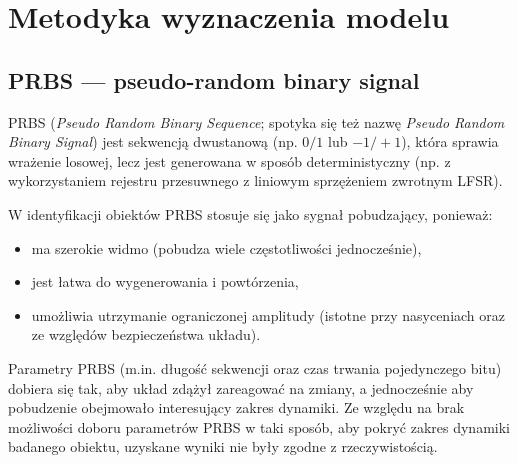 \section{Metodyka wyznaczenia modelu}

\subsection{PRBS --- pseudo-random binary signal}

PRBS (\emph{Pseudo Random Binary Sequence}; spotyka się też nazwę \emph{Pseudo Random Binary Signal}) jest sekwencją dwustanową (np. $0/1$ lub $-1/+1$), która sprawia wrażenie losowej, lecz jest generowana w sposób deterministyczny (np. z wykorzystaniem rejestru przesuwnego z liniowym sprzężeniem zwrotnym LFSR).

W identyfikacji obiektów PRBS stosuje się jako sygnał pobudzający, ponieważ:
\begin{itemize}
  \item ma szerokie widmo (pobudza wiele częstotliwości jednocześnie),
  \item jest łatwa do wygenerowania i powtórzenia,
  \item umożliwia utrzymanie ograniczonej amplitudy (istotne przy nasyceniach oraz ze względów bezpieczeństwa układu).
\end{itemize}

Parametry PRBS (m.in. długość sekwencji oraz czas trwania pojedynczego bitu) dobiera się tak, aby układ zdążył zareagować na zmiany, a jednocześnie aby pobudzenie obejmowało interesujący zakres dynamiki. Ze względu na brak możliwości doboru parametrów PRBS w taki sposób, aby pokryć zakres dynamiki badanego obiektu, uzyskane wyniki nie były zgodne z rzeczywistością.




\subsection{}
